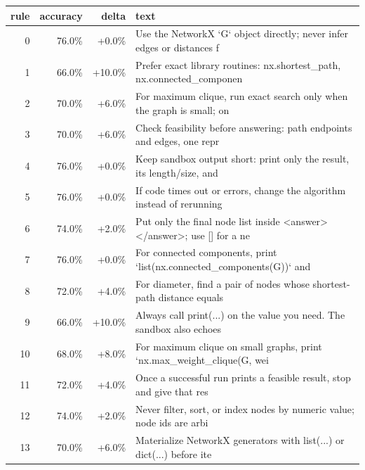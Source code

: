 \begin{tabular}{rrrp{7cm}}
\toprule
rule & accuracy & delta & text \\
\midrule
0 & 76.0\% & +0.0\% & Use the NetworkX `G` object directly; never infer edges or distances f \\
1 & 66.0\% & +10.0\% & Prefer exact library routines: nx.shortest\_path, nx.connected\_componen \\
2 & 70.0\% & +6.0\% & For maximum clique, run exact search only when the graph is small; on  \\
3 & 70.0\% & +6.0\% & Check feasibility before answering: path endpoints and edges, one repr \\
4 & 76.0\% & +0.0\% & Keep sandbox output short: print only the result, its length/size, and \\
5 & 76.0\% & +0.0\% & If code times out or errors, change the algorithm instead of rerunning \\
6 & 74.0\% & +2.0\% & Put only the final node list inside <answer></answer>; use [] for a ne \\
7 & 76.0\% & +0.0\% & For connected components, print `list(nx.connected\_components(G))` and \\
8 & 72.0\% & +4.0\% & For diameter, find a pair of nodes whose shortest-path distance equals \\
9 & 66.0\% & +10.0\% & Always call print(...) on the value you need. The sandbox also echoes  \\
10 & 68.0\% & +8.0\% & For maximum clique on small graphs, print `nx.max\_weight\_clique(G, wei \\
11 & 72.0\% & +4.0\% & Once a successful run prints a feasible result, stop and give that res \\
12 & 74.0\% & +2.0\% & Never filter, sort, or index nodes by numeric value; node ids are arbi \\
13 & 70.0\% & +6.0\% & Materialize NetworkX generators with list(...) or dict(...) before ite \\
\bottomrule
\end{tabular}
